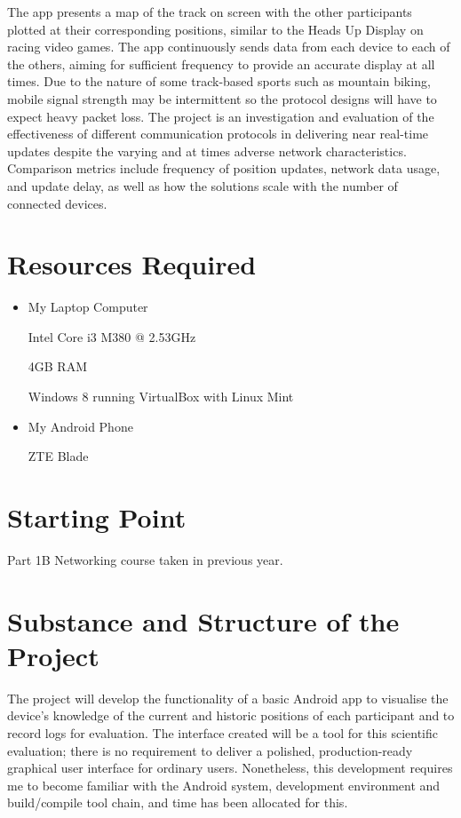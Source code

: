 \documentclass[12pt,twoside,notitlepage]{report}
\begin{document}
The app presents a map of the track on screen with the other participants plotted at their corresponding positions, similar to the Heads Up Display on racing video games.
The app continuously sends data from each device to each of the others, aiming for sufficient frequency to provide an accurate display at all times.
Due to the nature of some track-based sports such as mountain biking, mobile signal strength may be intermittent so the protocol designs will have to expect heavy packet loss.
The project is an investigation and evaluation of the effectiveness of different communication protocols in delivering near real-time updates despite the varying and at times adverse network characteristics.
Comparison metrics include frequency of position updates, network data usage, and update delay, as well as how the solutions scale with the number of connected devices.


\section*{Resources Required}

\begin{itemize}
\item{My Laptop Computer}

Intel Core i3 M380 @ 2.53GHz

4GB RAM

Windows 8 running VirtualBox with Linux Mint
\item{My Android Phone}

ZTE Blade
\end{itemize}

\section*{Starting Point}

Part 1B Networking course taken in previous year.

\section*{Substance and Structure of the Project}

The project will develop the functionality of a basic Android app to visualise the device's knowledge of the current and historic positions of each participant and to record logs for evaluation.  The interface created will be a tool for this scientific evaluation; there is no requirement to deliver a polished, production-ready graphical user interface for ordinary users.  Nonetheless, this development requires me to become familiar with the Android system, development environment and build/compile tool chain, and time has been allocated for this.
\end{document}
